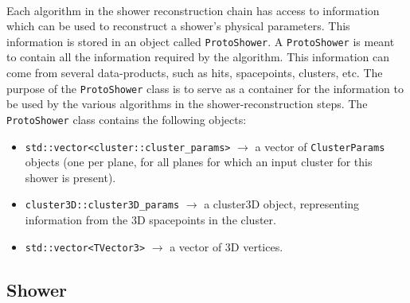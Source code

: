 \paragraph{}Each algorithm in the shower reconstruction chain has access to information which can be used to reconstruct a shower's physical parameters. This information is stored in an object called \texttt{ProtoShower}. A \texttt{ProtoShower} is meant to contain all the information required by the algorithm. This information can come from several data-products, such as hits, spacepoints, clusters, etc. The purpose of the \texttt{ProtoShower} class is to serve as a container for the information to be used by the various algorithms in the shower-reconstruction steps. The \texttt{ProtoShower} class contains the following objects:
\begin{itemize}
\item \texttt{std::vector<cluster::cluster\_params>} $\rightarrow$ a vector of \texttt{ClusterParams} objects (one per plane, for all planes for which an input cluster for this shower is present).
\item \texttt{cluster3D::cluster3D\_params} $\rightarrow$ a cluster3D object, representing information from the 3D spacepoints in the cluster.
\item \texttt{std::vector<TVector3>} $\rightarrow$ a vector of 3D vertices.
\end{itemize}

\subsection{Shower}
